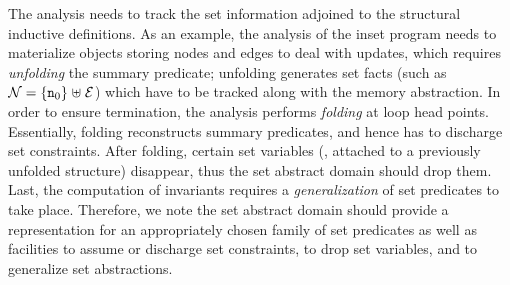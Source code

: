 \begin{wrapfigure}{r}{0.335\textwidth}
  \vspace{-8mm}
\end{wrapfigure}
The analysis needs to track the set information adjoined to the
structural inductive definitions.
As an example, the analysis of the inset program needs to materialize
objects storing nodes and edges to deal with updates, which requires
{\em unfolding} the summary predicate;
unfolding generates set facts (such as \( \mathcal{N} = \{ \texttt{n}_{0} \} \mathrel{\uplus}
\mathcal{E} \)) which have to be tracked along with the memory abstraction.
In order to ensure termination, the analysis performs {\em folding} at
loop head points.
Essentially, folding reconstructs summary predicates, and hence has to
discharge set constraints.
After folding, certain set variables (\eg, attached to a previously
unfolded structure) disappear, thus the set abstract domain should
drop them.
Last, the computation of invariants requires a {\em generalization}
of set predicates to take place.
Therefore, we note the set abstract domain should provide a
representation for an appropriately chosen family of set predicates
as well as facilities to assume or discharge set constraints, to
drop set variables, and to generalize set abstractions.

